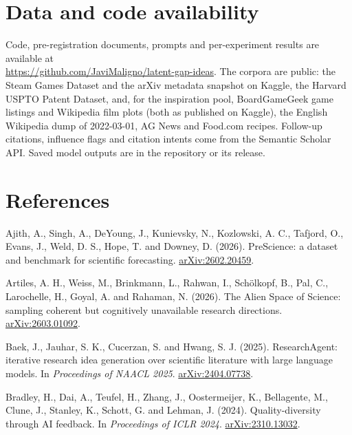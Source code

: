 \documentclass[
  10pt,
]{article}
\begin{document}
\section*{Data and code availability}

Code, pre-registration documents,
prompts and per-experiment results are
available at\\
\url{https://github.com/JaviMaligno/latent-gap-ideas}.
The corpora are public: the Steam Games
Dataset and the arXiv metadata snapshot
on Kaggle, the Harvard USPTO Patent
Dataset, and, for the inspiration pool,
BoardGameGeek game listings and
Wikipedia film plots (both as published
on Kaggle), the English Wikipedia dump
of 2022-03-01, AG News and Food.com
recipes. Follow-up citations, influence
flags and citation intents come from the
Semantic Scholar API. Saved model
outputs are in the repository or its
release.

\section*{References}

\begingroup\raggedright\small\setlength{\leftskip}{1.5em}\setlength{\parindent}{-1.5em}\setlength{\parskip}{3pt plus 1pt}

\hspace*{-1.5em}\hypertarget{ref-Ajith2026}{}Ajith,
A., Singh, A., DeYoung, J., Kunievsky,
N., Kozlowski, A. C., Tafjord, O.,
Evans, J., Weld, D. S., Hope, T. and
Downey, D. (2026). PreScience: a dataset
and benchmark for scientific
forecasting.
\href{https://arxiv.org/abs/2602.20459}{arXiv:2602.20459}.

\hypertarget{ref-Artiles2026}{}Artiles,
A. H., Weiss, M., Brinkmann, L., Rahwan,
I., Schölkopf, B., Pal, C., Larochelle,
H., Goyal, A. and Rahaman, N. (2026).
The Alien Space of Science: sampling
coherent but cognitively unavailable
research directions.
\href{https://arxiv.org/abs/2603.01092}{arXiv:2603.01092}.

\hypertarget{ref-Baek2025}{}Baek, J.,
Jauhar, S. K., Cucerzan, S. and Hwang,
S. J. (2025). ResearchAgent: iterative
research idea generation over scientific
literature with large language models.
In \emph{Proceedings of NAACL 2025}.
\href{https://arxiv.org/abs/2404.07738}{arXiv:2404.07738}.

\hypertarget{ref-Bradley2024}{}Bradley,
H., Dai, A., Teufel, H., Zhang, J.,
Oostermeijer, K., Bellagente, M., Clune,
J., Stanley, K., Schott, G. and Lehman,
J. (2024). Quality-diversity through AI
feedback. In \emph{Proceedings of ICLR
2024}.
\href{https://arxiv.org/abs/2310.13032}{arXiv:2310.13032}.
\end{document}
